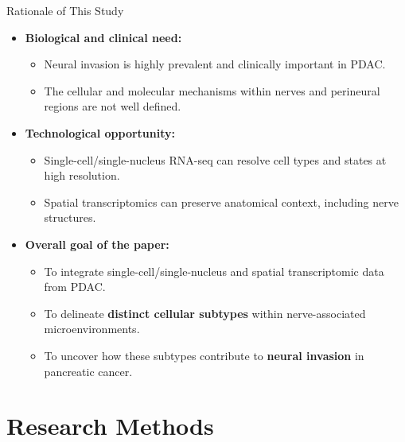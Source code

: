 \documentclass[10pt]{beamer}
\theoremstyle{plain}
\begin{document}
\begin{frame}{Rationale of This Study}
  \begin{itemize}
    \item \textbf{Biological and clinical need:}
      \begin{itemize}
        \item Neural invasion is highly prevalent and clinically important in PDAC.
        \item The cellular and molecular mechanisms within nerves and perineural regions are not well defined.
      \end{itemize}
    \item \textbf{Technological opportunity:}
      \begin{itemize}
        \item Single-cell/single-nucleus RNA-seq can resolve cell types and states at high resolution.
        \item Spatial transcriptomics can preserve anatomical context, including nerve structures.
      \end{itemize}
    \item \textbf{Overall goal of the paper:}
      \begin{itemize}
        \item To integrate single-cell/single-nucleus and spatial transcriptomic data from PDAC.
        \item To delineate \textbf{distinct cellular subtypes} within nerve-associated microenvironments.
        \item To uncover how these subtypes contribute to \textbf{neural invasion} in pancreatic cancer.
      \end{itemize}
  \end{itemize}
\end{frame}

\section{Research Methods}
\end{document}
